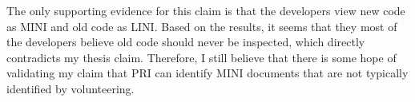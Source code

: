 The only supporting evidence for this claim is that the developers view new
code as MINI and old code as LINI. Based on the results, it seems that they
most of the developers believe old code should never be inspected, which
directly contradicts my thesis claim. Therefore, I still believe that there
is some hope of validating my claim that PRI can identify MINI documents
that are not typically identified by volunteering.














